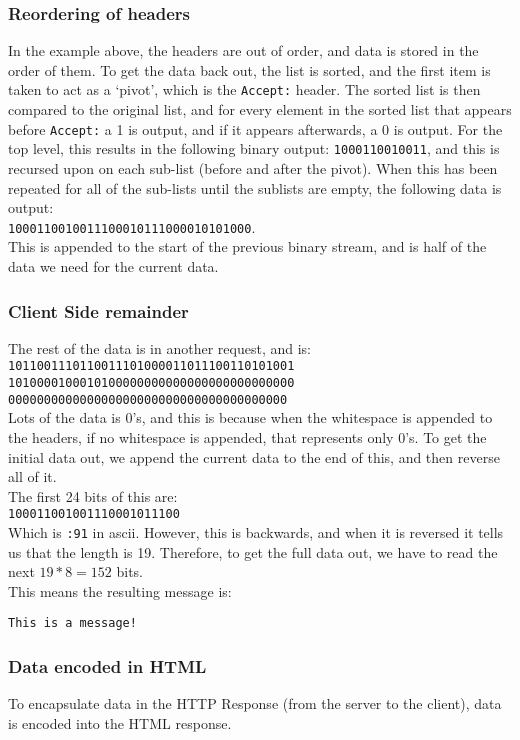 \subsubsection{Reordering of headers}
In the example above, the headers are out of order, and data is stored in the order of them.
To get the data back out, the list is sorted, and the first item is taken to act as a `pivot', which is the \texttt{Accept:} header.
The sorted list is then compared to the original list, and for every element in the sorted list that appears before \texttt{Accept:} a 1 is output, and if it appears afterwards, a 0 is output.
For the top level, this results in the following binary output: \texttt{1000110010011}, and this is recursed upon on each sub-list (before and after the pivot).
When this has been repeated for all of the sub-lists until the sublists are empty, the following data is output:\\
\texttt{1000110010011100010111000010101000}.\\
This is appended to the start of the previous binary stream, and is half of the data we need for the current data.
\subsubsection{Client Side remainder}
The rest of the data is in another request, and is:\\
\texttt{1011001110110011101000011011100110101001\\
1010000100010100000000000000000000000000\\
000000000000000000000000000000000000000}\\
Lots of the data is 0's, and this is because when the whitespace is appended to the headers, if no whitespace is appended, that represents only 0's.
To get the initial data out, we append the current data to the end of this, and then reverse all of it.\\
The first 24 bits of this are:\\
\texttt{100011001001110001011100}\\
Which is \texttt{:91} in ascii. However, this is backwards, and when it is reversed it tells us that the length is 19. Therefore, to get the full data out, we have to read the next $19 * 8 = 152$ bits.\\
This means the resulting message is:\par
\texttt{This is a message!}

\newpage
\subsubsection{Data encoded in HTML}
To encapsulate data in the HTTP Response (from the server to the client), data is encoded into the HTML response.

